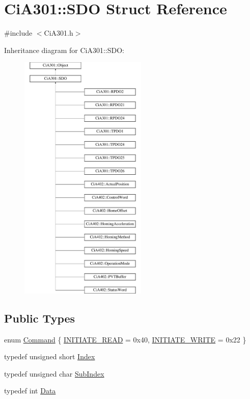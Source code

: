 \hypertarget{struct_ci_a301_1_1_s_d_o}{}\section{Ci\+A301\+:\+:S\+D\+O Struct Reference}
\label{struct_ci_a301_1_1_s_d_o}


{\ttfamily \#include $<$Ci\+A301.\+h$>$}

Inheritance diagram for Ci\+A301\+:\+:S\+D\+O\+:\begin{figure}[H]
\begin{center}
\leavevmode
\includegraphics[height=12.000000cm]{d5/d30/struct_ci_a301_1_1_s_d_o}
\end{center}
\end{figure}
\subsection*{Public Types}
\begin{DoxyCompactItemize}
\item 
enum \hyperlink{struct_ci_a301_1_1_s_d_o_a775f3ad0c6ad9894efd23092a37906ea}{Command} \{ \hyperlink{struct_ci_a301_1_1_s_d_o_a775f3ad0c6ad9894efd23092a37906eaae876c1cc1f0e9852492ba555cd5149db}{I\+N\+I\+T\+I\+A\+T\+E\+\_\+\+R\+E\+A\+D} = 0x40, 
\hyperlink{struct_ci_a301_1_1_s_d_o_a775f3ad0c6ad9894efd23092a37906eaac1a6618eed7bcf60cdad6a5acd583d6e}{I\+N\+I\+T\+I\+A\+T\+E\+\_\+\+W\+R\+I\+T\+E} = 0x22
 \}
\item 
typedef unsigned short \hyperlink{struct_ci_a301_1_1_s_d_o_a23ec0bef652b1fad0123ec3bed770852}{Index}
\item 
typedef unsigned char \hyperlink{struct_ci_a301_1_1_s_d_o_add21496adb09c6f74c8f725c17ec116a}{Sub\+Index}
\item 
typedef int \hyperlink{struct_ci_a301_1_1_s_d_o_a8224c82a3130510d9cdb8ae739de624b}{Data}
\end{DoxyCompactItemize}
